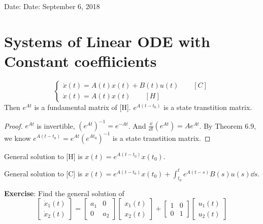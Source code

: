 \documentclass[twoside]{article}
\begin{document}

\hfill Date: Date: September 6, 2018

\section{Systems of Linear ODE with Constant coeffiicients}
\begin{theorem}
    \begin{equation}
    \begin{cases}
        \dot{x}(t) = A(t)x(t)+ B(t)u(t) \qquad [C]\\
        \dot{x}(t) = A(t)x(t)  \qquad [H]
    \end{cases}
    \end{equation}
    Then $e^{At}$ is a fundamental matrix of [H]. $e^{A(t-t_0)}$ is a state transtition matrix.
\end{theorem}
\begin{proof}
    $e^{At}$ is invertible, $(e^{At})^{-1} = e^{-At}$. And $\frac{\dd}{\dd t}(e^{At}) = A e^{At}$. By Theorem 6.9, we know $e^{A(t-t_0)} = e^{At} (e^{At_{0}})^{-1}$ is a state transtition matrix.
\end{proof}

\begin{theorem}
    General solution to [H] is $x(t) = e^{A(t-t_{0})}x(t_{0})  $.

    General solution to [C] is $x(t) = e^{A(t-t_{0})}x(t_{0}) + \int_{t_{0}}^{t} e^{A(t-s)}B(s)u(s) \dd s$.
\end{theorem}

\textbf{Exercise}: Find the general solution of \[
    \begin{bmatrix}
        \dot{x}_{1}(t)\\
        \dot{x}_{2}(t)
    \end{bmatrix}
    =
    \begin{bmatrix}
        a_{1} & 0\\
        0 & a_{2}
    \end{bmatrix}
    \begin{bmatrix}
        {x}_{1}(t)\\
        {x}_{2}(t)
    \end{bmatrix}
    +
    \begin{bmatrix}
        1 & 0\\
        0 & 1
    \end{bmatrix}
    \begin{bmatrix}
        u_{1}(t)\\
        u_{2}(t)
    \end{bmatrix}
\]
\end{document}
